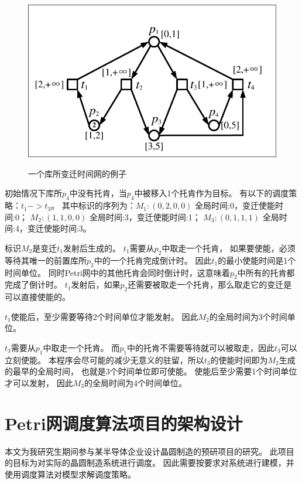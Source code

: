 \begin{figure}[H]
	\centering
	\includegraphics[scale=1.00,angle=0]{figures/TTPPN.pdf}\\
	\caption{一个库所变迁时间网的例子}
\end{figure}

初始情况下库所$p_{4}$中没有托肯，当$p_{4}$中被移入1个托肯作为目标。
有以下的调度策略：$t_{1}->t_{3}$。
其中标识的序列为：$M_{1}:(0,2,0,0)$ 全局时间:0，变迁使能时间:0；
$M_{2}:(1,1,0,0)$ 全局时间:3，变迁使能时间:1；
$M_{3}:(0,1,1,1)$ 全局时间:4，变迁使能时间:3。

标识$M_{2}$是变迁$t_{1}$发射后生成的。
$t_{1}$需要从$p_{2}$中取走一个托肯，
如果要使能，必须等待其唯一的前置库所$p_{2}$中的一个托肯完成倒计时。
因此$t_{1}$的最小使能时间是1个时间单位。
同时Petri网中的其他托肯会同时倒计时，这意味着$p_{2}$中所有的托肯都完成了倒计时。
$t_{1}$发射后，如果$p_{2}$还需要被取走一个托肯，那么取走它的变迁是可以直接使能的。

$t_{1}$使能后，至少需要等待2个时间单位才能发射。
因此$M_{2}$的全局时间为3个时间单位。

$t_{3}$需要从$p_{1}$中取走一个托肯。
而$p_{1}$中的托肯不需要等待就可以被取走，因此$t_{3}$可以立刻使能。
本程序会尽可能的减少无意义的驻留，所以$t_{3}$的使能时间即为$M_{2}$生成的最早的全局时间，
也就是3个时间单位即可使能。
使能后至少需要1个时间单位才可以发射，
因此$M_{3}$的全局时间为4个时间单位。

\section{Petri网调度算法项目的架构设计}
本文为我研究生期间参与某半导体企业设计晶圆制造的预研项目的研究。
此项目的目标为对实际的晶圆制造系统进行调度。
因此需要按要求对系统进行建模，并使用调度算法对模型求解调度策略。

